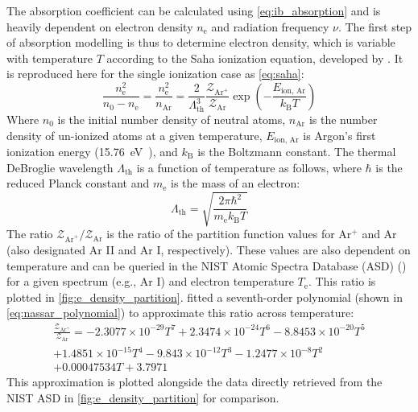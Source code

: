         The absorption coefficient can be calculated using \autoref{eq:ib_absorption} and is heavily dependent on electron density $n_\mathrm{e}$ and radiation frequency $\nu$. The first step of absorption modelling is thus to determine electron density, which is variable with temperature $T$ according to the Saha ionization equation, developed by \textcite{sahaPhysicalTheoryStellar1997}. It is reproduced here for the single ionization case as \autoref{eq:saha}:
        \begin{equation}
            \frac{n_\mathrm{e}^2}{n_0-n_\mathrm{e}} = \frac{n_\mathrm{e}^2}{n_\mathrm{Ar}} = \frac{2}{\Lambda_\mathrm{th}^3}\frac{\mathcal{Z}_{\mathrm{Ar}^+}}{\mathcal{Z}_\mathrm{Ar}}\exp{\left(-\frac{E_\text{ion, Ar}}{k_\mathrm{B}T}\right)}
            \label{eq:saha}
        \end{equation}
        Where $n_0$ is the initial number density of neutral atoms, $n_\mathrm{Ar}$ is the number density of un-ionized atoms at a given temperature, $E_\text{ion, Ar}$ is Argon's first ionization energy (\qty{15.76}{eV}~\cite{liasIonizationEnergyEvaluation2023}), and $k_\mathrm{B}$ is the Boltzmann constant. The thermal DeBroglie wavelength $\Lambda_\mathrm{th}$ is a function of temperature as follows, where $\hbar$ is the reduced Planck constant and $m_\mathrm{e}$ is the mass of an electron:
        \begin{equation*}
            \Lambda_\mathrm{th} = \sqrt{\frac{2\pi \hbar^2}{m_\mathrm{e}k_\mathrm{B}T}}
        \end{equation*}
        The ratio $\mathcal{Z}_{\mathrm{Ar}^+}/\mathcal{Z}_\mathrm{Ar}$ is the ratio of the partition function values for Ar$^+$ and Ar (also designated Ar II and Ar I, respectively). These values are also dependent on temperature and can be queried in the NIST Atomic Spectra Database (ASD) (\textcite{kramidaNISTAtomicSpectra2022}) for a given spectrum (e.g., Ar I) and electron temperature $T_\mathrm{e}$. This ratio is plotted in \autoref{fig:e_density_partition}. \citeauthor{nassarInvestigationLasersustainedPlasma2012} fitted a seventh-order polynomial (shown in \autoref{eq:nassar_polynomial}) to approximate this ratio across temperature:
        \begin{multline} \label{eq:nassar_polynomial}
            \frac{\mathcal{Z}_{\mathrm{Ar}^+}}{\mathcal{Z}_\mathrm{Ar}} = -2.3077\times 10^{-29}T^7+2.3474\times 10^{-24}T^6 - 8.8453\times 10^{-20}T^5 \\
            + 1.4851\times 10^{-15}T^4 -9.843\times 10^{-12}T^3 - 1.2477\times 10^{-8}T^2 \\
            + 0.00047534T+3.7971
        \end{multline}
        This approximation is plotted alongside the data directly retrieved from the NIST ASD in \autoref{fig:e_density_partition} for comparison.


